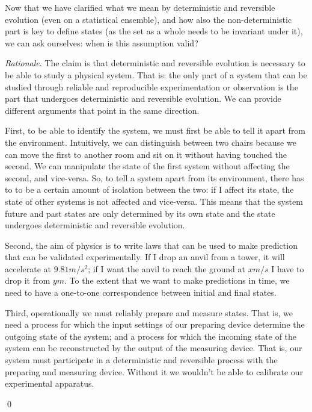 \documentclass[aps,pra,10pt,twocolumn,floatfix,nofootinbib]{revtex4-1}
\theoremstyle{definition}
\newenvironment{rationale}{\emph{Rationale}.}{\qed}
\begin{document}
Now that we have clarified what we mean by deterministic and reversible evolution (even on a statistical ensemble), and how also the non-deterministic part is key to define states (as the set as a whole needs to be invariant under it), we can ask ourselves: when is this assumption valid?

\begin{rationale}
The claim is that deterministic and reversible evolution is necessary to be able to study a physical system. That is: the only part of a system that can be studied through reliable and reproducible experimentation or observation is the part that undergoes deterministic and reversible evolution. We can provide different arguments that point in the same direction.

First, to be able to identify the system, we must first be able to tell it apart from the environment. Intuitively, we can distinguish between two chairs because we can move the first to another room and sit on it without having touched the second. We can manipulate the state of the first system without affecting the second, and vice-versa. So, to tell a system apart from its environment, there has to to be a certain amount of isolation between the two: if I affect its state, the state of other systems is not affected and vice-versa. This means that the system future and past states are only determined by its own state and the state undergoes deterministic and reversible evolution.

Second, the aim of physics is to write laws that can be used to make prediction that can be validated experimentally. If I drop an anvil from a tower, it will accelerate at $9.81 m/s^2$; if I want the anvil to reach the ground at $x m/s$ I have to drop it from $y m$. To the extent that we want to make predictions in time, we need to have a one-to-one correspondence between initial and final states.

Third, operationally we must reliably prepare and measure states. That is, we need a process for which the input settings of our preparing device determine the outgoing state of the system; and a process for which the incoming state of the system can be reconstructed by the output of the measuring device. That is, our system must participate in a deterministic and reversible process with the preparing and measuring device. Without it we wouldn't be able to calibrate our experimental apparatus.


\end{rationale}
\end{document}
